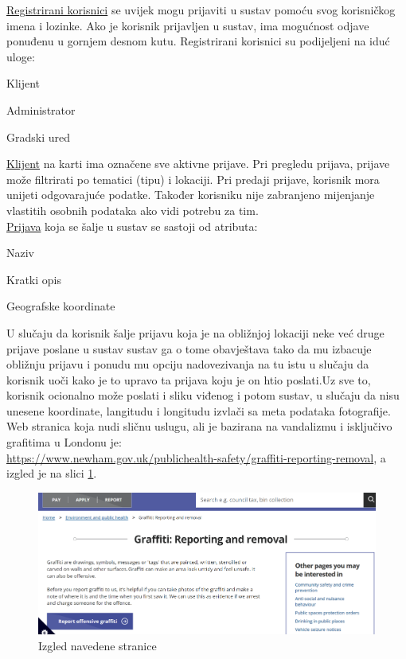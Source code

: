 		 \underline{Registrirani korisnici} se uvijek mogu prijaviti u sustav pomoću svog korisničkog imena i lozinke. Ako je korisnik prijavljen u sustav, ima mogućnost odjave ponuđenu u gornjem desnom kutu.
		\noindent Registrirani korisnici su podijeljeni na iduć uloge:
			\begin{packed_item}
			\item Klijent
			\item Administrator
			\item Gradski ured\\
			\end{packed_item}
			
			\underline{Klijent} na karti ima označene sve aktivne prijave. Pri pregledu prijava, prijave može filtrirati po tematici (tipu) i lokaciji. Pri predaji prijave, korisnik mora unijeti odgovarajuće podatke. Također korisniku nije zabranjeno mijenjanje vlastitih osobnih podataka ako vidi potrebu za tim.\\

 \underline{Prijava} koja se šalje u sustav se sastoji od atributa:
			\begin{packed_item}
			\item Naziv
			\item Kratki opis
			\item Geografske koordinate
			\end{packed_item}
			
			U slučaju da korisnik šalje prijavu koja je na obližnjoj lokaciji neke već druge prijave poslane u sustav sustav ga o tome obavještava  tako da mu izbacuje obližnju prijavu i ponudu mu opciju  nadovezivanja na tu istu u slučaju da korisnik uoči kako je to upravo ta prijava koju je on htio poslati.Uz sve to, korisnik ocionalno može poslati i sliku viđenog i potom sustav, u slučaju da nisu unesene koordinate, langitudu i longitudu izvlači sa meta podataka fotografije.\\
			
			  Web stranica koja  nudi sličnu uslugu, ali je bazirana na vandalizmu i isključivo grafitima u Londonu je: \\ \url{https://www.newham.gov.uk/publichealth-safety/graffiti-reporting-removal}, a izgled je na slici \ref{fig:promjene}.\\
			
			\begin{figure}[H]
			\includegraphics[scale=0.4]{slike/simular_page.PNG} %
			\centering
			\caption{Izgled navedene stranice}
			\label{fig:promjene}
		\end{figure}
		
